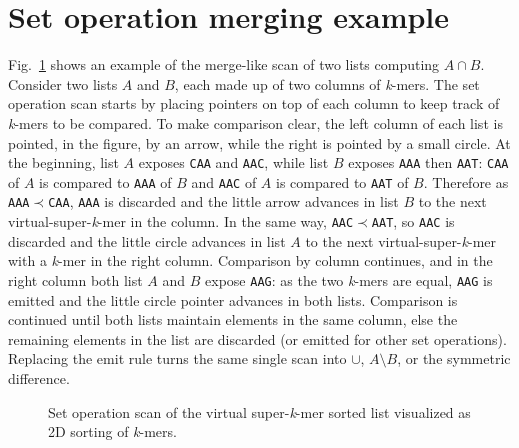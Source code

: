 \documentclass[runningheads,a4paper]{llncs}
\newcommand{\kmer}{\emph{k}-mer\xspace}
\newcommand{\kmers}{\emph{k}-mers\xspace}
\newcommand{\skmer}{super-\emph{k}-mer\xspace}
\newcommand{\vskmer}{virtual-super-\emph{k}-mer\xspace}
\newif\ifrevmarkup\revmarkupfalse
\newcommand{\rev}[1]{\ifrevmarkup\textcolor{blue}{#1}\else#1\fi}
\begin{document}
\section{Set operation merging example}
\label{app:setopex}
\rev{Fig.~\ref{fig:merging} shows an example of the merge-like scan of two lists computing $A\cap B$.
Consider two lists $A$ and $B$, each made up of two columns of \kmers.} The set operation scan starts by placing pointers on top of each column to keep track of \kmers to be compared. To make comparison clear, the left column of each list is pointed, in the figure, by an arrow, while the right is pointed by a small circle. At the beginning, list $A$ exposes \texttt{CAA} and \texttt{AAC}, while list $B$ exposes \texttt{AAA} then \texttt{AAT}: \texttt{CAA} of $A$ is compared to \texttt{AAA} of $B$ and \texttt{AAC} of $A$ is compared to \texttt{AAT} of $B$. Therefore as \texttt{AAA}${\prec}$\texttt{CAA}, \texttt{AAA} is discarded and the little arrow advances in list $B$ to the next \vskmer in the column. In the same way, \texttt{AAC}${\prec}$\texttt{AAT}, so \texttt{AAC} is discarded and the little circle advances in list $A$ to the next \vskmer with a \kmer in the right column. Comparison by column continues, and in the right column both list $A$ and $B$ expose \texttt{AAG}: as the two \kmers are equal, \texttt{AAG} is emitted and the little circle pointer advances in both lists. Comparison is continued until both lists maintain elements in the same column, else the remaining elements in the list are discarded (or emitted for other set operations). Replacing the emit rule turns the same single scan into $\cup$, $A\setminus B$, or the symmetric difference.

\begin{figure}[t]
\centering
\resizebox{\textwidth}{!}{}
\caption{Set operation scan of the virtual \skmer sorted list visualized as 2D sorting of \kmers.}
\label{fig:merging}
\end{figure}
\end{document}
